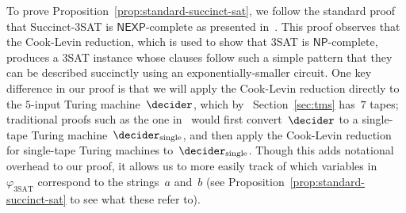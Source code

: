 To prove Proposition~\ref{prop:standard-succinct-sat}, we follow the standard
proof that Succinct-3SAT is $\mathsf{NEXP}$-complete as presented
in~\cite{Pap94}.
This proof observes that the Cook-Levin reduction, which is used to show that
3SAT is $\mathsf{NP}$-complete, produces a 3SAT instance whose clauses follow
such a simple pattern that they can be described succinctly using an
exponentially-smaller circuit.
One key difference in our proof is that we will apply the Cook-Levin reduction
directly to the $5$-input Turing machine~$\decider$, which by \
Section~\ref{sec:tms} has~$7$ tapes; traditional proofs such as the one
in~\cite{Pap94} would first convert~$\decider$ to a single-tape Turing
machine~$\decider_{\mathrm{single}}$, and then apply the Cook-Levin reduction
for single-tape Turing machines to~$\decider_{\mathrm{single}}$.
Though this adds notational overhead to our proof, it allows us to more easily
track of which variables in $\varphi_{\mathrm{3SAT}}$ correspond to the
strings~$a$ and~$b$ (see Proposition~\ref{prop:standard-succinct-sat} to see
what these refer to).

